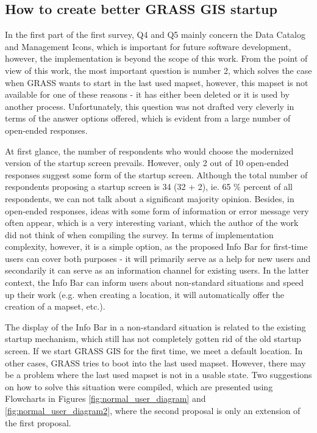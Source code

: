 \documentclass[a4paper,10pt,twoside]{article}
\begin{document}
\subsection{How to create better GRASS GIS startup}
\label{sec:proposal2}

In the first part of the first survey, Q4 and Q5 mainly concern the Data Catalog and Management Icons, which is important for future software development, however, the implementation is beyond the scope of this work. From the point of view of this work, the most important question is number 2, which solves the case when GRASS wants to start in the last used mapset, however, this mapset is not available for one of these reasons - it has either been deleted or it is used by another process. Unfortunately, this question was not drafted very cleverly in terms of the answer options offered, which is evident from a large number of open-ended responses.

At first glance, the number of respondents who would choose the modernized version of the startup screen prevails. However, only 2 out of 10 open-ended responses suggest some form of the startup screen. Although the total number of respondents proposing a startup screen is 34 (32 + 2), ie. 65 \% percent of all respondents, we can not talk about a significant majority opinion. Besides, in open-ended responses, ideas with some form of information or error message very often appear, which is a very interesting variant, which the author of the work did not think of when compiling the survey. In terms of implementation complexity, however, it is a simple option, as the proposed Info Bar for first-time users can cover both purposes - it will primarily serve as a help for new users and secondarily it can serve as an information channel for existing users. In the latter context, the Info Bar can inform users about non-standard situations and speed up their work (e.g. when creating a location, it will automatically offer the creation of a mapset, etc.).

The display of the Info Bar in a non-standard situation is related to the existing startup mechanism, which still has not completely gotten rid of the old startup screen. If we start GRASS GIS for the first time, we meet a default location. In other cases, GRASS tries to boot into the last used mapset. However, there may be a problem where the last used mapset is not in a usable state. Two suggestions on how to solve this situation were compiled, which are presented using Flowcharts in Figures \ref{fig:normal_user_diagram} and \ref{fig:normal_user_diagram2}, where the second proposal is only an extension of the first proposal.
\end{document}
